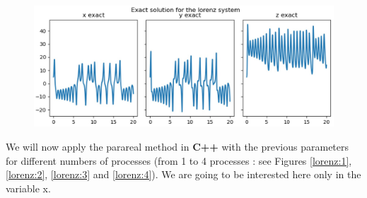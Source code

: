\begin{enumerate}[label=\textbullet]
\begin{figure}[H]
\begin{minipage}[t]{0.48\linewidth}
		\end{minipage}
		\label{lorenz:exact3D}
	\end{figure}
	\begin{figure}[H]  
		\centering     
		\includegraphics[width=0.9\linewidth]{"images/parareal/cpp/lorenz_exact.jpg"}
		\label{lorenz:exact}
	\end{figure}

	We will now apply the parareal method in \textbf{C++} with the previous parameters for different numbers of processes (from 1 to 4 processes : see Figures \ref{lorenz:1}, \ref{lorenz:2}, \ref{lorenz:3} and \ref{lorenz:4}). We are going to be interested here only in the variable x.

	\begin{enumerate}[label=-]
	

\end{enumerate}
\end{enumerate}
